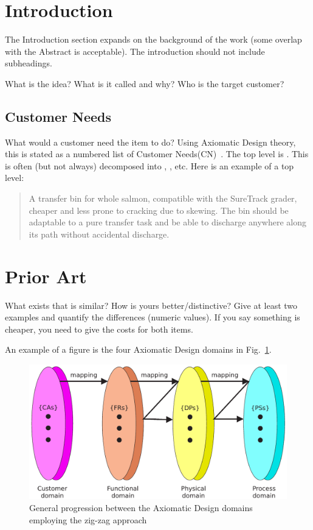 \documentclass[sn-mathphys,pdflatex]{sn-jnl}%
\theoremstyle{thmstyleone}%
\theoremstyle{thmstyletwo}%
\theoremstyle{thmstylethree}%
\begin{document}
\section{Introduction}\label{sec:introduction}
The Introduction section expands on the background of the work (some overlap with the Abstract is acceptable).
The introduction should not include subheadings.

What is the idea?  What is it called and why?
Who is the target customer?



\subsection{Customer Needs}\label{sec:customer-needs}
What would a customer need the item to do?  
Using Axiomatic Design theory, this is stated as a numbered list of Customer Needs(CN)~\cite{suh1990principles}.
The top level is .
This is often (but not always) decomposed into , , etc.
Here is an example of a top level:

\begin{quote} \textbf{} A transfer bin for whole salmon, compatible with the SureTrack grader, cheaper and less prone to cracking due to skewing.  
The bin should be adaptable to a pure transfer task and be able to discharge anywhere along its path without
accidental discharge.~\cite{gerhard2016suretrack}
\end{quote}


\section{Prior Art}\label{sec:prior-art}
What exists that is similar?  How is yours better/distinctive?
Give at least two examples and quantify the differences (numeric values).
If you say something is cheaper, you need to give the costs for both items.

An example of a figure is the four Axiomatic Design domains in Fig.~\ref{fig:ad-domains}.
\begin{figure}
  \centering
  \includegraphics[width=0.9\columnwidth]{ad-domains-zig}
  \caption{General progression between the Axiomatic Design domains employing the zig-zag approach}\label{fig:ad-domains}
\end{figure}
\end{document}
